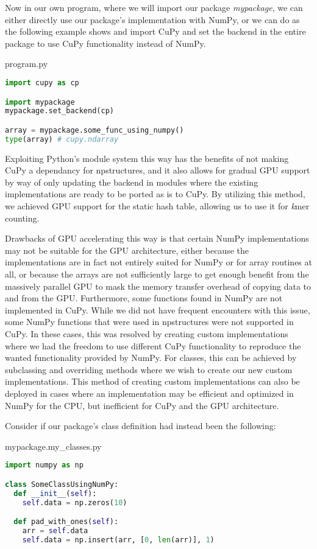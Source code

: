 Now in our own program, where we will import our package \textit{mypackage}, we can either directly use our package's implementation with NumPy, or we can do as the following example shows and import CuPy and set the backend in the entire package to use CuPy functionality instead of NumPy.

\begin{center}
program.py
\end{center}
\begin{lstlisting}[language=Python,style=pycode]
import cupy as cp

import mypackage
mypackage.set_backend(cp)

array = mypackage.some_func_using_numpy()
type(array) # cupy.ndarray
\end{lstlisting}

Exploiting Python's module system this way has the benefits of not making CuPy a dependancy for npstructures, and it also allows for gradual GPU support by way of only updating the backend in modules where the existing implementations are ready to be ported as is to CuPy.
By utilizing this method, we achieved GPU support for the static hash table, allowing us to use it for \textit{k}mer counting.

Drawbacks of GPU accelerating this way is that certain NumPy implementations may not be suitable for the GPU architecture, either because the implementations are in fact not entirely suited for NumPy or for array routines at all, or because the arrays are not sufficiently large to get enough benefit from the massively parallel GPU to mask the memory transfer overhead of copying data to and from the GPU.
Furthermore, some functions found in NumPy are not implemented in CuPy.
While we did not have frequent encounters with this issue, some NumPy functions that were used in npstructures were not supported in CuPy.
In these cases, this was resolved by creating custom implementations where we had the freedom to use different CuPy functionality to reproduce the wanted functionality provided by NumPy.
For classes, this can be achieved by subclassing and overriding methods where we wish to create our new custom implementations.
This method of creating custom implementations can also be deployed in cases where an implementation may be efficient and optimized in NumPy for the CPU, but inefficient for CuPy and the GPU architecture.

Consider if our package's class definition had instead been the following:
\begin{center}
mypackage.my\_classes.py
\end{center}
\begin{lstlisting}[language=Python,style=pycode]
import numpy as np

class SomeClassUsingNumPy:
  def __init__(self):
    self.data = np.zeros(10)

  def pad_with_ones(self):
    arr = self.data
    self.data = np.insert(arr, [0, len(arr)], 1)
\end{lstlisting}

